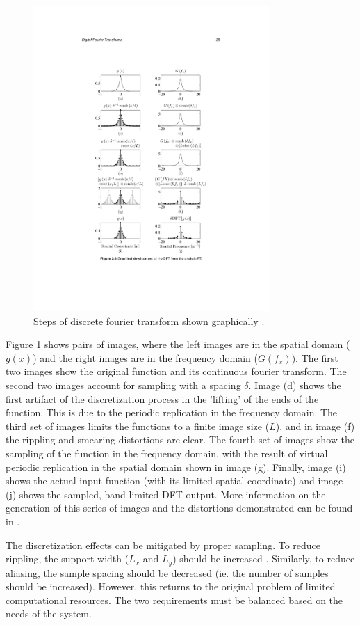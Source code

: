 \begin{figure}[H]
	\centering
		\includegraphics[trim=2cm 4cm 2cm 4cm, clip=true, width=0.8\textwidth]{figures/DFTGraphically.pdf}
	\caption{Steps of discrete fourier transform shown graphically \cite{NSOWP}.}
	\label{fig:DFTGraphs}
\end{figure}

Figure \ref{fig:DFTGraphs} shows pairs of images, where the left images are in the spatial domain ($g(x)$) and the right images are in the frequency domain ($G(f_x)$).  The first two images show the original function and its continuous fourier transform.  The second two images account for sampling with a spacing $\delta$.  Image (d) shows the first artifact of the discretization process in the 'lifting' of the ends of the function.  This is due to the periodic replication in the frequency domain.  The third set of images limits the functions to a finite image size ($L$), and in image (f) the rippling and smearing distortions are clear.  The fourth set of images show the sampling of the function in the frequency domain, with the result of virtual periodic  replication in the spatial domain shown in image (g).  Finally, image (i) shows the actual input function (with its limited spatial coordinate) and image (j) shows the sampled, band-limited DFT output. More information on the generation of this series of images and the distortions demonstrated can be found in \cite{NSOWP}. 

The discretization effects can be mitigated by proper sampling. To reduce rippling, the support width ($L_x$ and $L_y$) should be increased \cite{NSOWP}.  Similarly, to reduce aliasing, the sample spacing should be decreased (ie. the number of samples should be increased).  However, this returns to the original problem of limited computational resources.  The two requirements must be balanced based on the needs of the system.  




